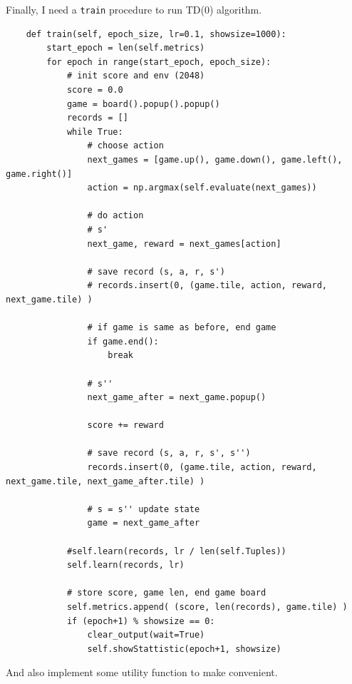 \documentclass[12pt]{article}
\begin{document}
Finally, I need a \verb|train| procedure to run TD(0) algorithm.

\begin{verbatim}
    def train(self, epoch_size, lr=0.1, showsize=1000):
        start_epoch = len(self.metrics)
        for epoch in range(start_epoch, epoch_size):
            # init score and env (2048)
            score = 0.0
            game = board().popup().popup()
            records = []
            while True:
                # choose action
                next_games = [game.up(), game.down(), game.left(), game.right()]
                action = np.argmax(self.evaluate(next_games))
                
                # do action
                # s'
                next_game, reward = next_games[action]
                
                # save record (s, a, r, s')
                # records.insert(0, (game.tile, action, reward, next_game.tile) )
                
                # if game is same as before, end game
                if game.end():
                    break
                
                # s''
                next_game_after = next_game.popup()
                
                score += reward
                
                # save record (s, a, r, s', s'')
                records.insert(0, (game.tile, action, reward, next_game.tile, next_game_after.tile) )
                
                # s = s'' update state
                game = next_game_after
                
            #self.learn(records, lr / len(self.Tuples))
            self.learn(records, lr)
            
            # store score, game len, end game board
            self.metrics.append( (score, len(records), game.tile) )
            if (epoch+1) % showsize == 0:
                clear_output(wait=True)
                self.showStattistic(epoch+1, showsize)
\end{verbatim}

And also implement some utility function to make convenient.
\end{document}

